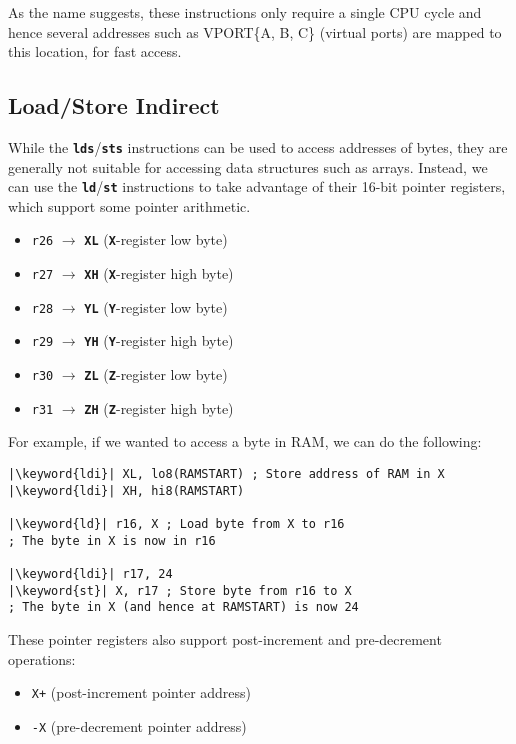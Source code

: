 \documentclass{report}
\newcommand{\keyword}[1]{\textcolor[rgb]{0.00,0.50,0.00}{\textbf{#1}}}
\newcommand{\keywordinline}[1]{\textcolor[rgb]{0.00,0.50,0.00}{\textbf{\texttt{#1}}}}
\begin{document}
As the name suggests, these instructions only require a single CPU
cycle and hence several addresses such as VPORT\{A, B, C\} (virtual
ports) are mapped to this location, for fast access.
\subsection{Load/Store Indirect}
While the \keywordinline{lds}/\keywordinline{sts} instructions can be
used to access addresses of bytes, they are generally not suitable for
accessing data structures such as arrays. Instead, we can use the
\keywordinline{ld}/\keywordinline{st} instructions to take advantage of
their 16-bit pointer registers, which support some pointer arithmetic.
\begin{itemize}
    \item \texttt{r26} \(\to\) \keywordinline{XL} (\keywordinline{X}-register low byte)
    \item \texttt{r27} \(\to\) \keywordinline{XH} (\keywordinline{X}-register high byte)
    \item \texttt{r28} \(\to\) \keywordinline{YL} (\keywordinline{Y}-register low byte)
    \item \texttt{r29} \(\to\) \keywordinline{YH} (\keywordinline{Y}-register high byte)
    \item \texttt{r30} \(\to\) \keywordinline{ZL} (\keywordinline{Z}-register low byte)
    \item \texttt{r31} \(\to\) \keywordinline{ZH} (\keywordinline{Z}-register high byte)
\end{itemize}
For example, if we wanted to access a byte in RAM, we can do the following:
\begin{verbatim}
|\keyword{ldi}| XL, lo8(RAMSTART) ; Store address of RAM in X
|\keyword{ldi}| XH, hi8(RAMSTART)

|\keyword{ld}| r16, X ; Load byte from X to r16
; The byte in X is now in r16

|\keyword{ldi}| r17, 24
|\keyword{st}| X, r17 ; Store byte from r16 to X
; The byte in X (and hence at RAMSTART) is now 24
\end{verbatim}
These pointer registers also support post-increment and pre-decrement
operations:
\begin{itemize}
    \item \texttt{X+} (post-increment pointer address)
    \item \texttt{-X} (pre-decrement pointer address)
\end{itemize}
\end{document}
